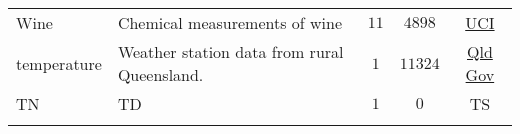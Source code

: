 \begin{longtable}{lp{}ccc}
    Wine                                                                     & Chemical measurements of wine                                                                                                                                                        & $11$    & $4898$                                                                    & \href{https://archive.ics.uci.edu/ml/datasets/Wine+Quality}{UCI} \\
    temperature                                                              & Weather station data from rural Queensland.                                                                                                                                          & $1$     & $11324$                                                                   & \href{https://www.longpaddock.qld.gov.au/}{Qld Gov}              \\
    TN                                                                       & TD                                                                                                                                                                                   & $1$     & $0$                                                                       & TS                                                               \\
    \\\bottomrule
    \hline
\end{longtable}